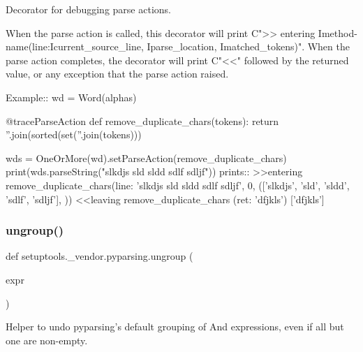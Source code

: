 \begin{DoxyVerb}Decorator for debugging parse actions. 

When the parse action is called, this decorator will print C{">> entering I{method-name}(line:I{current_source_line}, I{parse_location}, I{matched_tokens})".}
When the parse action completes, the decorator will print C{"<<"} followed by the returned value, or any exception that the parse action raised.

Example::
    wd = Word(alphas)

    @traceParseAction
    def remove_duplicate_chars(tokens):
        return ''.join(sorted(set(''.join(tokens)))

    wds = OneOrMore(wd).setParseAction(remove_duplicate_chars)
    print(wds.parseString("slkdjs sld sldd sdlf sdljf"))
prints::
    >>entering remove_duplicate_chars(line: 'slkdjs sld sldd sdlf sdljf', 0, (['slkdjs', 'sld', 'sldd', 'sdlf', 'sdljf'], {}))
    <<leaving remove_duplicate_chars (ret: 'dfjkls')
    ['dfjkls']
\end{DoxyVerb}
 \mbox{\label{namespacesetuptools_1_1__vendor_1_1pyparsing_a4eccbcc70b9c528f34c89347bef1d5c5}} 
\subsubsection{\texorpdfstring{ungroup()}{ungroup()}}
{\footnotesize\ttfamily def setuptools.\+\_\+vendor.\+pyparsing.\+ungroup (\begin{DoxyParamCaption}\item[{}]{expr }\end{DoxyParamCaption})}

\begin{DoxyVerb}Helper to undo pyparsing's default grouping of And expressions, even
if all but one are non-empty.
\end{DoxyVerb}
 \mbox{\label{namespacesetuptools_1_1__vendor_1_1pyparsing_a13346f3af1fe015ad47cc58eafd5e455}} 

